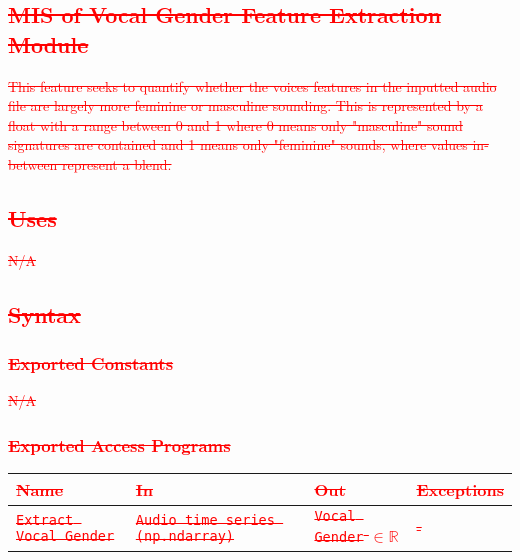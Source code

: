 \documentclass[12pt, titlepage]{article}
\begin{document}
\subsection{\textcolor{red}{\sout{MIS of Vocal Gender Feature Extraction Module}}}
\textcolor{red}{\sout{This feature seeks to quantify whether the voices features in the inputted audio file 
are largely more feminine or masculine sounding. This is represented by a float with a range between
0 and 1 where 0 means only "masculine" sound signatures are contained and 1 means only "feminine" sounds,
where values in-between represent a blend.}}

\subsection{\textcolor{red}{\sout{Uses}}}
\textcolor{red}{\sout{N/A}}

\subsection{\textcolor{red}{\sout{Syntax}}}

\subsubsection{\textcolor{red}{\sout{Exported Constants}}}
\textcolor{red}{\sout{N/A}}

\subsubsection{\textcolor{red}{\sout{Exported Access Programs}}}

\begin{center}
\begin{tabular}{p{2cm} p{4cm} p{4cm} p{2cm}}
\hline
\textcolor{red}{\sout{\textbf{Name}}} & \textcolor{red}{\sout{\textbf{In}}} & \textcolor{red}{\sout{\textbf{Out}}} & \textcolor{red}{\sout{\textbf{Exceptions}}}\\
\hline
\textcolor{red}{\sout{\texttt{Extract Vocal Gender}}} & \textcolor{red}{\sout{\texttt{Audio time series (np.ndarray)}}} & \textcolor{red}{\sout{\texttt{Vocal Gender} $\in \mathbb{R}$}} & \textcolor{red}{\sout{-}}\\
\hline
\end{tabular}
\end{center}
\end{document}
